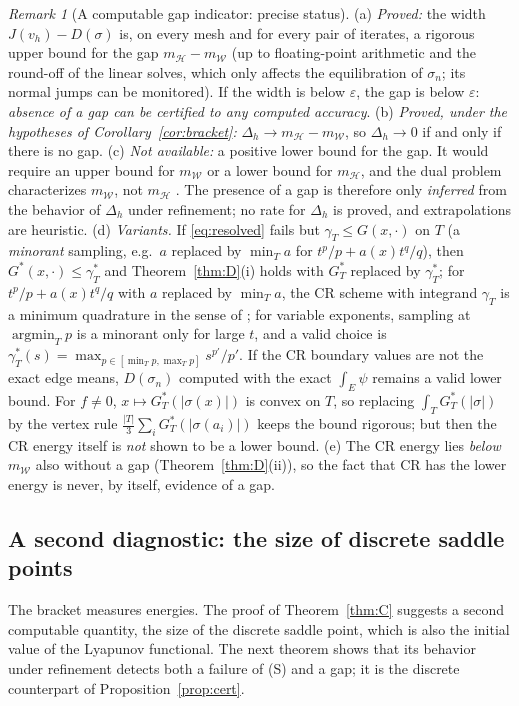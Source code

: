 \documentclass[11pt]{amsart}
\theoremstyle{definition}
\theoremstyle{remark}
\newtheorem{remark}[theorem]{Remark}
\numberwithin{equation}{section}
\newcommand{\abs}[1]{\lvert #1\rvert}
\newcommand{\mW}{m_{\mathcal W}}
\newcommand{\mH}{m_{\mathcal H}}
\begin{document}
\begin{remark}[A computable gap indicator: precise status]\label{rem:gap-indicator}
(a) \emph{Proved:} the width $J(v_h)-D(\sigma)$ is, on every mesh and for every pair of iterates, a rigorous upper bound for the gap $\mH-\mW$ (up to floating-point arithmetic and the round-off of the linear solves, which only affects the equilibration of $\sigma_n$; its normal jumps can be monitored). If the width is below $\varepsilon$, the gap is below $\varepsilon$: \emph{absence of a gap can be certified to any computed accuracy}.
(b) \emph{Proved, under the hypotheses of Corollary~\ref{cor:bracket}:} $\Delta_h\to\mH-\mW$, so $\Delta_h\to0$ if and only if there is no gap.
(c) \emph{Not available:} a positive lower bound for the gap. It would require an upper bound for $\mW$ or a lower bound for $\mH$, and the dual problem characterizes $\mW$, not $\mH$ \cite[Lemma~6]{BalciOrtnerStorn2022}. The presence of a gap is therefore only \emph{inferred} from the behavior of $\Delta_h$ under refinement; no rate for $\Delta_h$ is proved, and extrapolations are heuristic.
(d) \emph{Variants.} If \eqref{eq:resolved} fails but $\gamma_T\le G(x,\cdot)$ on $T$ (a \emph{minorant} sampling, e.g.\ $a$ replaced by $\min_Ta$ for $t^p/p+a(x)t^q/q$), then $G^*(x,\cdot)\le\gamma_T^*$ and Theorem~\ref{thm:D}(i) holds with $G_T^*$ replaced by $\gamma_T^*$; for $t^p/p+a(x)t^q/q$ with $a$ replaced by $\min_Ta$, the CR scheme with integrand $\gamma_T$ is a minimum quadrature in the sense of \cite[\S4]{BalciOrtnerStorn2022}; for variable exponents, sampling at $\operatorname{argmin}_Tp$ is a minorant only for large $t$, and a valid choice is $\gamma_T^*(s)=\max_{p\in[\min_Tp,\max_Tp]}s^{p'}/p'$. If the CR boundary values are not the exact edge means, $D(\sigma_n)$ computed with the exact $\int_E\psi$ remains a valid lower bound. For $f\ne0$, $x\mapsto G_T^*(\abs{\sigma(x)})$ is convex on $T$, so replacing $\int_TG_T^*(\abs\sigma)$ by the vertex rule $\frac{\abs T}3\sum_iG_T^*(\abs{\sigma(a_i)})$ keeps the bound rigorous; but then the CR energy itself is \emph{not} shown to be a lower bound.
(e) The CR energy lies \emph{below} $\mW$ also without a gap (Theorem~\ref{thm:D}(ii)), so the fact that CR has the lower energy is never, by itself, evidence of a gap.
\end{remark}

\subsection{A second diagnostic: the size of discrete saddle points}\label{ssec:diag}
The bracket measures energies. The proof of Theorem~\ref{thm:C} suggests a second computable quantity, the size of the discrete saddle point, which is also the initial value of the Lyapunov functional. The next theorem shows that its behavior under refinement detects both a failure of (S) and a gap; it is the discrete counterpart of Proposition~\ref{prop:cert}.
\end{document}
